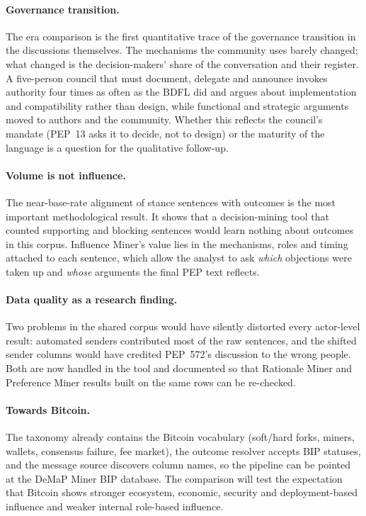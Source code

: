 \documentclass[sigconf,screen]{acmart}
\begin{document}
\paragraph{Governance transition.} The era comparison is the first quantitative trace of the governance transition in the discussions themselves. The mechanisms the community uses barely changed; what changed is the decision-makers' share of the conversation and their register. A five-person council that must document, delegate and announce invokes authority four times as often as the BDFL did and argues about implementation and compatibility rather than design, while functional and strategic arguments moved to authors and the community. Whether this reflects the council's mandate (PEP~13 asks it to decide, not to design) or the maturity of the language is a question for the qualitative follow-up.

\paragraph{Volume is not influence.} The near-base-rate alignment of stance sentences with outcomes is the most important methodological result. It shows that a decision-mining tool that counted supporting and blocking sentences would learn nothing about outcomes in this corpus. Influence Miner's value lies in the mechanisms, roles and timing attached to each sentence, which allow the analyst to ask \emph{which} objections were taken up and \emph{whose} arguments the final PEP text reflects.

\paragraph{Data quality as a research finding.} Two problems in the shared corpus would have silently distorted every actor-level result: automated senders contributed most of the raw sentences, and the shifted sender columns would have credited PEP~572's discussion to the wrong people. Both are now handled in the tool and documented so that Rationale Miner and Preference Miner results built on the same rows can be re-checked.

\paragraph{Towards Bitcoin.} The taxonomy already contains the Bitcoin vocabulary (soft/hard forks, miners, wallets, consensus failure, fee market), the outcome resolver accepts BIP statuses, and the message source discovers column names, so the pipeline can be pointed at the DeMaP Miner BIP database. The comparison will test the expectation that Bitcoin shows stronger ecosystem, economic, security and deployment-based influence and weaker internal role-based influence.
\end{document}
